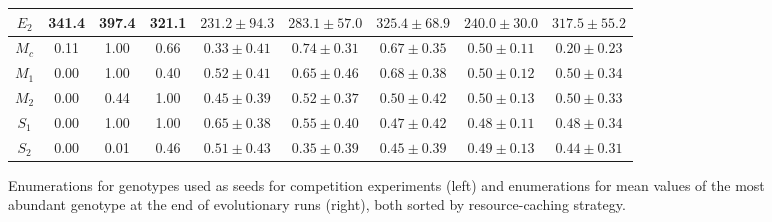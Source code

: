 \begin{figure*}
\begin{center}
\begin{tabular}{ | c || c c c | c c c | c | c | }
 $E_2$ & 341.4 & 397.4 & 321.1 & $231.2 \pm 94.3$ & $283.1 \pm 57.0$ & $325.4 \pm 68.9$ & $240.0 \pm 30.0$ & $317.5 \pm 55.2$ \\
 \hline
 $M_{c}$ & 0.11 & 1.00 & 0.66 & $0.33 \pm 0.41$ & $0.74 \pm 0.31$ & $0.67 \pm 0.35$ & $0.50 \pm 0.11$ & $0.20 \pm 0.23$ \\
 $M_1$ & 0.00 & 1.00 & 0.40 & $0.52 \pm 0.41$ & $0.65 \pm 0.46$ & $0.68 \pm 0.38$ & $0.50 \pm 0.12$ & $0.50 \pm 0.34$ \\
 $M_2$ & 0.00 & 0.44 & 1.00 & $0.45 \pm 0.39$ & $0.52 \pm 0.37$ & $0.50 \pm 0.42$ & $0.50 \pm 0.13$ & $0.50 \pm 0.33$ \\
 \hline
 $S_1$ & 0.00 & 1.00 & 1.00 & $0.65 \pm 0.38$ & $0.55 \pm 0.40$ & $0.47 \pm 0.42$ & $0.48 \pm 0.11$ & $0.48 \pm 0.34$ \\
 $S_2$ & 0.00 & 0.01 & 0.46 & $0.51 \pm 0.43$ & $0.35 \pm 0.39$ & $0.45 \pm 0.39$ & $0.49 \pm 0.13$ & $0.44 \pm 0.31$ \\
 \hline
\end{tabular}
\end{center}
\caption{
Enumerations for genotypes used as seeds for competition experiments (left) and enumerations for mean values of the most abundant genotype at the end of evolutionary runs (right), both sorted by resource-caching strategy.
}
\label{fig:genotypes}
\end{figure*}
